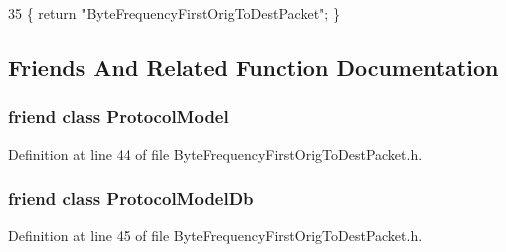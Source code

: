 \begin{DoxyCode}
35 \{ \textcolor{keywordflow}{return} \textcolor{stringliteral}{"ByteFrequencyFirstOrigToDestPacket"}; \}
\end{DoxyCode}


\subsection{Friends And Related Function Documentation}
\hypertarget{class_vsid_1_1_byte_frequency_first_orig_to_dest_packet_a80219b863d4ff3456933d16bc5f73f45}{
\subsubsection[{Protocol\-Model}]{\setlength{\rightskip}{0pt plus 5cm}friend class {\bf Protocol\-Model}\hspace{0.3cm}{\ttfamily [friend]}}}\label{class_vsid_1_1_byte_frequency_first_orig_to_dest_packet_a80219b863d4ff3456933d16bc5f73f45}


Definition at line 44 of file Byte\-Frequency\-First\-Orig\-To\-Dest\-Packet.\-h.

\hypertarget{class_vsid_1_1_byte_frequency_first_orig_to_dest_packet_a3c0d389e7a9476b06313d8fb9ca9fe68}{
\subsubsection[{Protocol\-Model\-Db}]{\setlength{\rightskip}{0pt plus 5cm}friend class {\bf Protocol\-Model\-Db}\hspace{0.3cm}{\ttfamily [friend]}}}\label{class_vsid_1_1_byte_frequency_first_orig_to_dest_packet_a3c0d389e7a9476b06313d8fb9ca9fe68}


Definition at line 45 of file Byte\-Frequency\-First\-Orig\-To\-Dest\-Packet.\-h.



